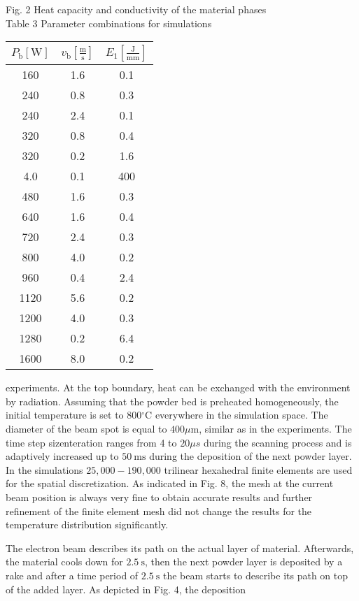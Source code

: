 \documentclass[10pt]{article}
\begin{document}
Fig. 2 Heat capacity and conductivity of the material phases\\
Table 3 Parameter combinations for simulations

\begin{center}
\begin{tabular}{ccc}
\hline
$P_{\mathrm{b}}[\mathrm{W}]$ & $v_{\mathrm{b}}\left[\frac{\mathrm{m}}{\mathrm{s}}\right]$ & $E_{1}\left[\frac{\mathrm{J}}{\mathrm{mm}}\right]$ \\
\hline
160 & 1.6 & 0.1 \\
240 & 0.8 & 0.3 \\
240 & 2.4 & 0.1 \\
320 & 0.8 & 0.4 \\
320 & 0.2 & 1.6 \\
4.0 & 0.1 & 400 \\
480 & 1.6 & 0.3 \\
640 & 1.6 & 0.4 \\
720 & 2.4 & 0.3 \\
800 & 4.0 & 0.2 \\
960 & 0.4 & 2.4 \\
1120 & 5.6 & 0.2 \\
1200 & 4.0 & 0.3 \\
\hline
1280 & 0.2 & 6.4 \\
\hline
1600 & 8.0 & 0.2 \\
\hline
\end{tabular}
\end{center}

experiments. At the top boundary, heat can be exchanged with the environment by radiation. Assuming that the powder bed is preheated homogeneously, the initial temperature is set to $800{ }^{\circ} \mathrm{C}$ everywhere in the simulation space. The diameter of the beam spot is equal to $400 \mu \mathrm{m}$, similar as in the experiments. The time step sizenteration ranges from 4 to $20 \mu s$ during the scanning process and is adaptively increased up to $50 \mathrm{~ms}$ during the deposition of the next powder layer. In the simulations $25,000-190,000$ trilinear hexahedral finite elements are used for the spatial discretization. As indicated in Fig. 8, the mesh at the current beam position is always very fine to obtain accurate results and further refinement of the finite element mesh did not change the results for the temperature distribution significantly.

The electron beam describes its path on the actual layer of material. Afterwards, the material cools down for $2.5 \mathrm{~s}$, then the next powder layer is deposited by a rake and after a time period of $2.5 \mathrm{~s}$ the beam starts to describe its path on top of the added layer. As depicted in Fig. 4, the deposition
\end{document}
